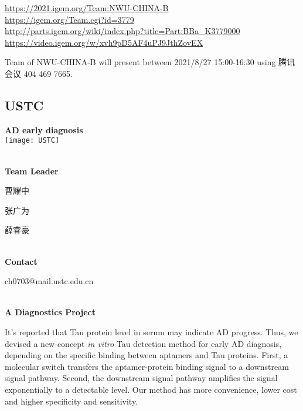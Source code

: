 \url{https://2021.igem.org/Team:NWU-CHINA-B }\\
\url{https://igem.org/Team.cgi?id=3779 }\\
\url{http://parts.igem.org/wiki/index.php?title=Part:BBa_K3779000 }\\
\url{https://video.igem.org/w/xvh9pD5AF4uPJ9JthZovEX }\\

\vfill{}









Team of NWU-CHINA-B will present between  2021/8/27 15:00-16:30       using 腾讯会议 404 469 7665.
\newpage


\subsection{\textcolor{Blu}{ USTC } }
\vspace{5mm}
\begin{center}
\large{
  \textbf{ AD early diagnosis }\\

  \texttt{[image: USTC]}
}
\end{center}
\textbf{\\Team Leader}

  曹耀中

  张广为

  薛睿豪


\textbf{\\Contact}

  ch0703@mail.ustc.edu.cn


\textbf{\\A Diagnostics Project\\}\begin{spacing}{1.5}

It's reported that Tau protein level in serum may indicate AD progress. Thus, we devised a new-concept \textit{in vitro} Tau detection method for early AD diagnosis, depending on the specific binding between aptamers and Tau proteins. First, a molecular switch transfers the aptamer-protein binding signal to a downstream signal pathway. Second, the downstream signal pathway amplifies the signal exponentially to a detectable level. Our method has more convenience, lower cost and higher specificity and sensitivity.\end{spacing}
\\


